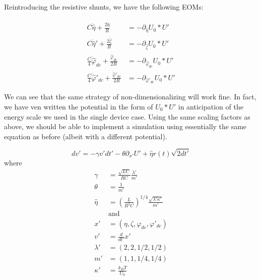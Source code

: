 \documentclass[paper=a4, twocolumn, fontsize=10pt]{article} %
\numberwithin{equation}{section} %
\numberwithin{figure}{section} %
\numberwithin{table}{section} %
\def \df#1{\hat{#1}}
\def \dl#1{#1}
\begin{document}
Reintroducing the resistive shunts, we have the following EOMs:

\begin{align*}
    C \ddot{\df\eta} + \frac{2 \dot{\df\eta}}{R} &= -\partial_{\df\eta} U_0 * U' \\
    C \ddot{\df\eta}' + \frac{2 \dot{\df\zeta}}{R}  &= -\partial_{\df\zeta} U_0 * U' \\
\frac{C}{4} \ddot{\df\varphi}_{dc} + \frac{\dot{\df\varphi}_{dc}}{2R} &= -\partial_{\df\varphi_{dc}} U_0 * U' \\
\frac{C}{4} \ddot{\df\varphi}'_{dc} + \frac{\dot{\df\varphi}'_{dc}}{2R} &= -\partial_{\df\varphi'_{dc}} U_0 * U'
\end{align*}

We can see that the same strategy of non-dimensionalizing will work fine. In fact, we have ven written the potential in the form of $U_0 * U'$ in anticipation of the energy scale we used in the single device case. Using the same scaling factors as above, we should be able to implement a simulation using essentially the same equation as before (albeit with a different potential).

\[ dv' = -\gamma v' dt' - \theta \partial_{x'} U' + \df\eta r(t) \sqrt{2dt'} \]
where
\begin{align*}
    \gamma &=  \frac{\sqrt{LC} }{ RC} \frac{\lambda'}{m'}  \\
    \theta &= \frac{1 }{ m'} \\
    \df\eta &= \left(  \frac{L}{R^2 C} \right)^{1/4} \frac{\sqrt{\lambda'\kappa'}}{m'} \\
    &\text{and} \\
    x' &= (\dl\eta, \dl\zeta, \dl\varphi_{dc}, \dl\varphi'_{dc}) \\
    v' &= \frac{d}{dt'} x' \\
    \lambda' &= (2, 2, 1/2, 1/2) \\
    m' &= ( 1, 1, 1/4, 1/4) \\
    \kappa' &= \frac{k_B T}{U_0}
\end{align*}
\end{document}
